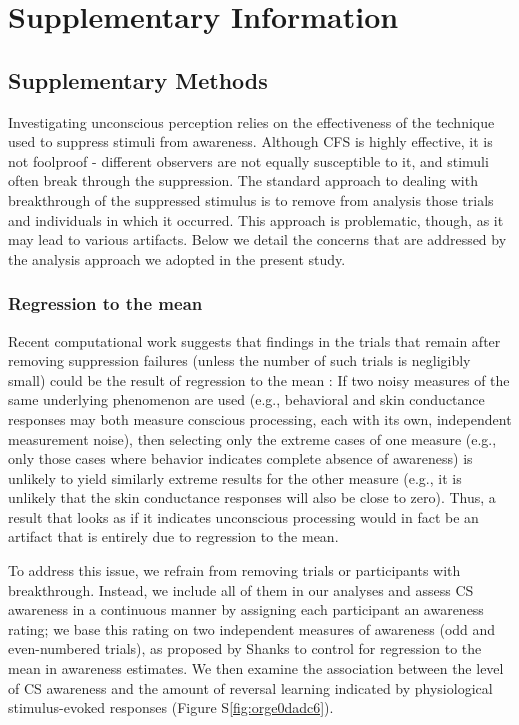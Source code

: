 \documentclass[12pt]{article}
\begin{document}
\clearpage

\section*{Supplementary Information}
\label{sec:org15a3020}
\doublespacing
\setcounter{figure}{0}
\setcounter{table}{0}

\subsection*{Supplementary Methods}
\label{sec:org7456d85}
Investigating unconscious perception relies on the effectiveness of the
technique used to suppress stimuli from awareness. Although CFS is
highly effective, it is not foolproof - different observers are not
equally susceptible to it, and stimuli often break through the
suppression. The standard approach to dealing with breakthrough of the
suppressed stimulus is to remove from analysis those trials and
individuals in which it occurred. This approach is problematic, though,
as it may lead to various artifacts. Below we detail the concerns that
are addressed by the analysis approach we adopted in the present study.

\subsubsection*{Regression to the mean}
\label{sec:org072aa50}
Recent computational work suggests that findings in the trials
that remain after removing suppression failures (unless the number of
such trials is negligibly small) could be the result of regression to
the mean \cite{Shanks2016}: If two noisy measures of the same
underlying phenomenon are used (e.g., behavioral and skin conductance
responses may both measure conscious processing, each with its own,
independent measurement noise), then selecting only the extreme cases of
one measure (e.g., only those cases where behavior indicates complete
absence of awareness) is unlikely to yield similarly extreme results for
the other measure (e.g., it is unlikely that the skin conductance
responses will also be close to zero). Thus, a result that looks as if
it indicates unconscious processing would in fact be an artifact that is
entirely due to regression to the mean.

To address this issue, we refrain from removing trials or participants
with breakthrough. Instead, we include all of them in our analyses and
assess CS awareness in a continuous manner by assigning each participant
an awareness rating; we base this rating on two independent measures of
awareness (odd and even-numbered trials), as proposed by Shanks
\cite{Shanks2016} to control for regression to the mean in awareness
estimates. We then examine the association between the level of CS
awareness and the amount of reversal learning indicated by physiological
stimulus-evoked responses (Figure S\ref{fig:orge0dadc6}).
\end{document}
